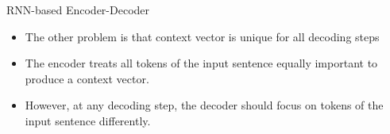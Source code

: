 

    
            
            


            


\begin{frame}{RNN-based Encoder-Decoder}
\begin{itemize}
    \item The other problem is that context vector is unique for all decoding steps
    \item The encoder treats all tokens of the input sentence equally important to produce a context vector. 
    \item However, at any decoding step, the decoder should focus on tokens of the input sentence differently. 
\end{itemize}
\end{frame}


